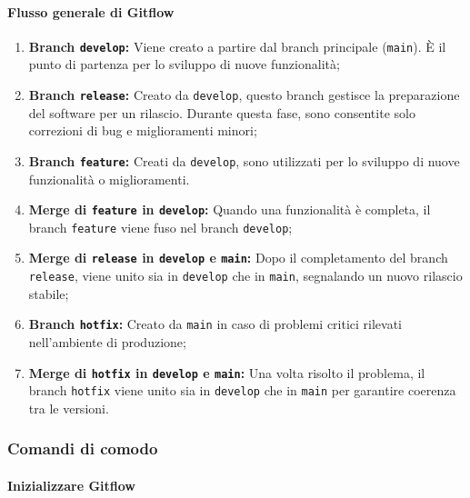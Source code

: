 \paragraph*{Flusso generale di Gitflow}

\begin{enumerate}
    \item \textbf{Branch \texttt{develop}:} Viene creato a partire dal branch principale (\texttt{main}). È il punto di partenza per lo sviluppo di nuove funzionalità;

    \item \textbf{Branch \texttt{release}:} Creato da \texttt{develop}, questo branch gestisce la preparazione del software per un rilascio. Durante questa fase, sono consentite solo correzioni di bug e miglioramenti minori;

    \item \textbf{Branch \texttt{feature}:} Creati da \texttt{develop}, sono utilizzati per lo sviluppo di nuove funzionalità o miglioramenti. 

    \item \textbf{Merge di \texttt{feature} in \texttt{develop}:} Quando una funzionalità è completa, il branch \texttt{feature} viene fuso nel branch \texttt{develop};

    \item \textbf{Merge di \texttt{release} in \texttt{develop} e \texttt{main}:} Dopo il completamento del branch \texttt{release}, viene unito sia in \texttt{develop} che in \texttt{main}, segnalando un nuovo rilascio stabile;

    \item \textbf{Branch \texttt{hotfix}:} Creato da \texttt{main} in caso di problemi critici rilevati nell'ambiente di produzione;

    \item \textbf{Merge di \texttt{hotfix} in \texttt{develop} e \texttt{main}:} Una volta risolto il problema, il branch \texttt{hotfix} viene unito sia in \texttt{develop} che in \texttt{main} per garantire coerenza tra le versioni.
\end{enumerate}

\subsubsection*{Comandi di comodo}
\paragraph*{Inizializzare Gitflow}

